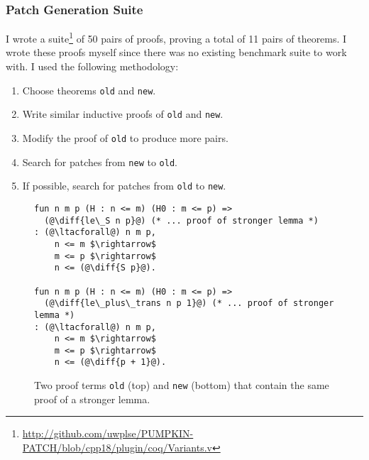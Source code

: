\subsubsection{Patch Generation Suite}
\label{sec:suite}

I wrote a suite\footnote{\url{http://github.com/uwplse/PUMPKIN-PATCH/blob/cpp18/plugin/coq/Variants.v}} of 50 pairs of proofs,
proving a total of 11 pairs of theorems.
I wrote these proofs myself since there was no existing benchmark suite to work with.
I used the following methodology:

\begin{enumerate}
\item Choose theorems \lstinline{old} and \lstinline{new}.
\item Write similar inductive proofs of \lstinline{old} and \lstinline{new}.
\item Modify the proof of \lstinline{old} to produce more pairs.
\item Search for patches from \lstinline{new} to \lstinline{old}.
\item If possible, search for patches from \lstinline{old} to \lstinline{new}.
\end{enumerate}

\iffalse
For example, one pair of theorems \lstinline{old} and \lstinline{new} was a 
simplification of the auxiliary lemmas
that we encountered in the case study in Section~\ref{sec:foundations}.
For the first proof of \lstinline{old}, we added a rewrite, like in the case study:

\begin{lstlisting}[language=coq]
    (@\diff{rewrite <- plus\_n\_O.}@) rewrite -> plus_comm.
\end{lstlisting}

For the second proof of \lstinline{old}, we commuted the rewrites:

\begin{lstlisting}[language=coq]
    rewrite -> plus_comm. (@\diff{rewrite <- plus\_n\_O.}@)
\end{lstlisting} 

We then searched for patches in both directions,
since the conclusions of \lstinline{old}
and \lstinline{new} were propositionally equal.
\fi

\begin{figure*}
\begin{lstlisting}[language=coq]
fun n m p (H : n <= m) (H0 : m <= p) =>
  (@\diff{le\_S n p}@) (* ... proof of stronger lemma *)
: (@\ltacforall@) n m p,
    n <= m $\rightarrow$
    m <= p $\rightarrow$
    n <= (@\diff{S p}@).

fun n m p (H : n <= m) (H0 : m <= p) =>
  (@\diff{le\_plus\_trans n p 1}@) (* ... proof of stronger lemma *)
: (@\ltacforall@) n m p,
    n <= m $\rightarrow$
    m <= p $\rightarrow$
    n <= (@\diff{p + 1}@).
\end{lstlisting}
\caption{Two proof terms \lstinline{old} (top) and \lstinline{new} (bottom) that contain the same proof of a stronger lemma.}
\label{fig:stronger}
\end{figure*}

